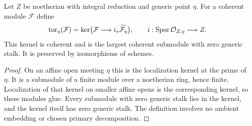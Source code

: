 \begin{lemma}\label{lem:generic-torsion}
Let $Z$ be noetherian with integral reduction and generic point $\eta$.
For a coherent module $\mathcal F$ define
\[
 \operatorname{tor}_{\eta}(\mathcal F)
   =\ker\bigl(\mathcal F\longrightarrow
       i_*\widetilde{\mathcal F_\eta}\bigr),
 \qquad i:\operatorname{Spec}\mathcal O_{Z,\eta}\longrightarrow Z.
\]
This kernel is coherent and is the largest coherent submodule with
zero generic stalk. It is preserved by isomorphisms of schemes.
\end{lemma}
\begin{proof}
On an affine open meeting $\eta$ this is the localization kernel at
the prime of $\eta$. It is a submodule of a finite module over a
noetherian ring, hence finite. Localization of that kernel on smaller
affine opens is the corresponding kernel, so these modules glue.
Every submodule with zero generic stalk lies in the kernel, and the
kernel itself has zero generic stalk. The definition involves no
ambient embedding or chosen primary decomposition.
\end{proof}

